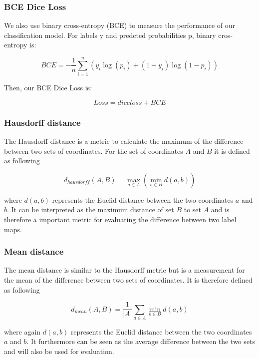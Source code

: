 \subsubsection{BCE Dice Loss}
We also use binary cross-entropy (BCE) to measure the performance of our classification model. For labels y and predcted probabilities p, binary cros-entropy is:

\begin{equation}
BCE = - \frac{1}{n} \sum_{i=1}^{n}(y_i \log{(p_i)} + (1-y_i)\log{(1-p_i)})
\end{equation} 


Then, our BCE Dice Loss is:

\begin{equation}
Loss =  dice loss + BCE
\end{equation}

\subsubsection{Hausdorff distance}
The Hausdorff distance is a metric to calculate the maximum of the difference between two sets of coordinates.\newline
For the set of coordinates $A$ and $B$ it is defined as following

\begin{equation}
	d_{hausdorff} (A,B) = \max_{a \in A} (\min_{b \in B} d(a,b))
\end{equation} 

where $d(a,b)$ represents the Euclid distance between the two coordinates $a$ and $b$. It can be interpreted as the maximum distance of set $B$ to set $A$ and is therefore a important metric for evaluating the difference between two label maps.

\subsubsection{Mean distance}
The mean distance is similar to the Hausdorff metric but is a measurement for the mean of the difference between two sets of coordinates.\newline
It is therefore defined as following

\begin{equation}
	d_{mean} (A,B) = \frac{1}{|A|} \sum_{a \in A} \min_{b \in B} d(a,b)
\end{equation}

where again $d(a,b)$ represents the Euclid distance between the two coordinates $a$ and $b$. It furthermore can be seen as the average difference between the two sets and will also be used for evaluation.
